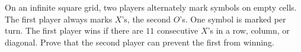 On an infinite square grid, two players alternately mark symbols on empty cells. The first player always marks $X$'s, the second $O$'s. One symbol is marked per turn. The first player wins if there are $11$ consecutive $X$'s in a row, column, or diagonal. Prove that the second player can prevent the first from winning.
